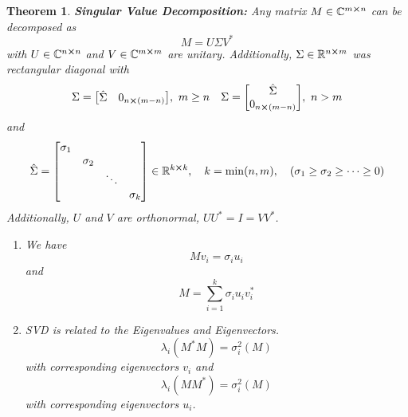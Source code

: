 \documentclass[letter]{article}
\numberwithin{equation}{section}
\newcommand{\R}{\mathbb{R}}
\newcommand{\C}{\mathbb{C}}
\newtheorem{theorem}{Theorem}
\begin{document}
\begin{theorem}
    \textbf{Singular Value Decomposition:} 
    Any matrix $M \in \C^{m \cross n}$ can be decomposed as \[
        M = U \Sigma V^*
    \] with $U \in \C^{n \cross n}$ and $V \in \C^{m \cross m}$ are unitary. 
    Additionally, $\Sigma \in \R^{n \cross m}$ was rectangular diagonal with \begin{align*}
        \Sigma = \mqty[
            \hat{\Sigma} &0_{n \cross (m-n)}
        ], \ m \geq n
        &&
        \Sigma = \mqty[
            \hat{\Sigma} \\0_{n \cross (m-n)}
        ], \ n > m
    \end{align*} and \[
        \hat{\Sigma} = \mqty[\dmat{\sigma_1, \sigma_2, \ddots, \sigma_k}] \in \R^{k\cross k}, 
        \quad k = \min(n,m), 
        \quad (\sigma_1 \geq \sigma_2 \geq \cdots \geq 0)
    \] Additionally, $U$ and $V$ are orthonormal, $U U^* = I = V V^*$. \begin{enumerate}
        \item We have \[
            M v_i = \sigma_i u_i
        \] and \[
            M = \sum_{i=1}^{k} \sigma_i u_i v_i^*
        \]
        \item SVD is related to the Eigenvalues and Eigenvectors. \[
            \lambda_i(M^* M) = \sigma_i^2(M)
        \] with corresponding eigenvectors $v_i$ and \[
            \lambda_i(M M^*) = \sigma_i^2(M)
        \] with corresponding eigenvectors $u_i$.
    \end{enumerate}
\end{theorem}
\end{document}
